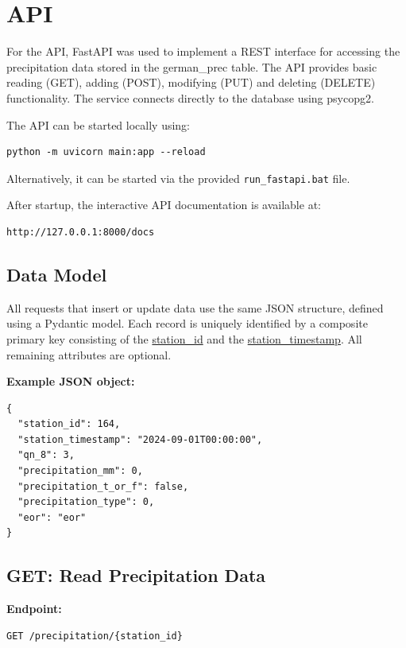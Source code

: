 \setlength{\parindent}{0pt}

\section{API}
For the API, FastAPI\cite{fastAPI_documentation} was used to implement a REST interface for accessing the precipitation data stored in the german\_prec table.
The API provides basic reading (GET), adding (POST), modifying (PUT) and deleting
(DELETE) functionality.
The service connects directly to the database using psycopg2.

The API can be started locally using:
\begin{verbatim}
python -m uvicorn main:app --reload
\end{verbatim}

Alternatively, it can be started via the provided \texttt{run\_fastapi.bat} file.
\par\vspace{0.5em}
After startup, the interactive API documentation is available at:
\begin{verbatim}
http://127.0.0.1:8000/docs
\end{verbatim}

\subsection{Data Model}

All requests that insert or update data use the same JSON structure, defined using a Pydantic model.
Each record is uniquely identified by a composite primary key consisting of the \underline{station\_id} and the \underline{station\_timestamp}.
All remaining attributes are optional.
\par\vspace{0.5em}
\textbf{Example JSON object:}
\begin{verbatim}
{
  "station_id": 164,
  "station_timestamp": "2024-09-01T00:00:00",
  "qn_8": 3,
  "precipitation_mm": 0,
  "precipitation_t_or_f": false,
  "precipitation_type": 0,
  "eor": "eor"
}
\end{verbatim}

\subsection{GET: Read Precipitation Data}

\textbf{Endpoint:}
\begin{verbatim}
GET /precipitation/{station_id}
\end{verbatim}

